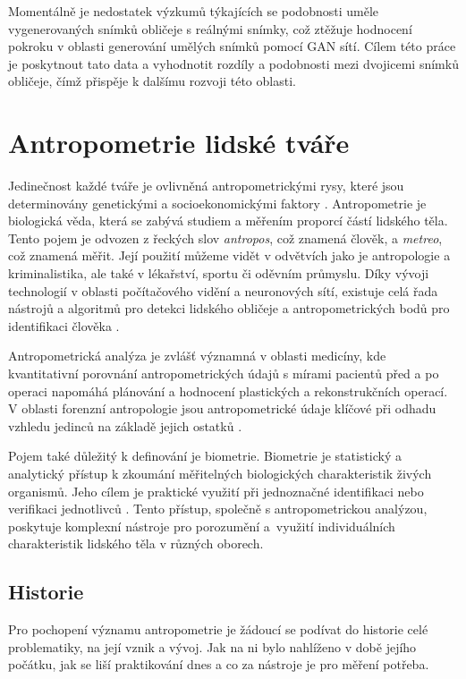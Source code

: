Momentálně je nedostatek výzkumů týkajících se podobnosti uměle vygenerovaných snímků obličeje s reálnými snímky, což ztěžuje hodnocení pokroku v oblasti generování umělých snímků pomocí GAN sítí. Cílem této práce je poskytnout tato data a vyhodnotit rozdíly a podobnosti mezi dvojicemi snímků obličeje, čímž přispěje k dalšímu rozvoji této oblasti.

\chapter{Antropometrie lidské tváře}
\label{proporce}
Jedinečnost každé tváře je ovlivněná antropometrickými rysy, které jsou determinovány genetickými a socioekonomickými faktory \cite{Komlos}. Antropometrie je biologická věda, která se zabývá studiem a měřením proporcí částí lidského těla. Tento pojem je odvozen z řeckých slov \textit{antropos}, což znamená člověk, a \textit{metreo}, což znamená měřit. Její použití můžeme vidět v odvětvích jako je antropologie a kriminalistika, ale také v lékařství, sportu či oděvním průmyslu. Díky vývoji technologií v oblasti počítačového vidění a neuronových sítí, existuje celá řada nástrojů a algoritmů pro detekci lidského obličeje a antropometrických bodů pro identifikaci člověka \cite{Hugh1911}.

Antropometrická analýza je zvlášť významná v oblasti medicíny, kde kvantitativní porovnání antropometrických údajů s mírami pacientů před a po operaci napomáhá plánování a hodnocení plastických a rekonstrukčních operací. V oblasti forenzní antropologie jsou antropometrické údaje klíčové při odhadu vzhledu jedinců na základě jejich ostatků \cite{DeCarlo1998}.

Pojem také důležitý k definování je biometrie. Biometrie je statistický a analytický přístup k zkoumání měřitelných biologických charakteristik živých organismů. Jeho cílem je praktické využití při jednoznačné identifikaci nebo verifikaci jednotlivců \cite{NAP12720}. Tento přístup, společně s antropometrickou analýzou, poskytuje komplexní nástroje pro porozumění a~využití individuálních charakteristik lidského těla v různých oborech.

\section{Historie}

Pro pochopení významu antropometrie je žádoucí se podívat do historie celé problematiky, na její vznik a vývoj. Jak na ni bylo nahlíženo v době jejího počátku, jak se liší praktikování dnes a co za nástroje je pro měření potřeba.

